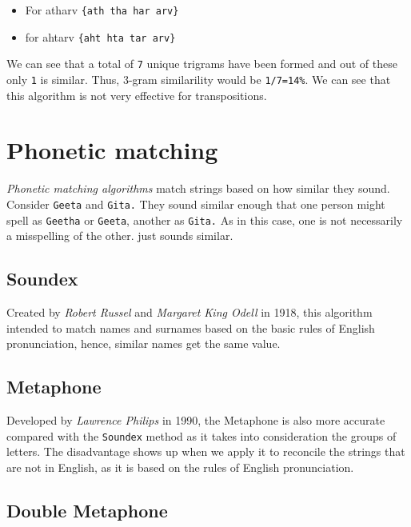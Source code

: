 \documentclass[
]{book}
\providecommand{\tightlist}{%
  \setlength{\itemsep}{0pt}\setlength{\parskip}{0pt}}
\begin{document}
\begin{itemize}
\tightlist
\item
  For atharv \texttt{\{ath\ tha\ har\ arv\}}
\item
  for ahtarv \texttt{\{aht\ hta\ tar\ arv\}}
\end{itemize}

We can see that a total of \texttt{7} unique trigrams have been formed and out of these only \texttt{1} is similar. Thus, 3-gram similarility would be \texttt{1/7=14\%}. We can see that this algorithm is not very effective for transpositions.

\hypertarget{phonetic-matching}{%
\section{Phonetic matching}\label{phonetic-matching}}

\emph{Phonetic matching algorithms} match strings based on how similar they sound. Consider \texttt{Geeta} and \texttt{Gita.} They sound similar enough that one person might spell as \texttt{Geetha} or \texttt{Geeta}, another as \texttt{Gita.} As in this case, one is not necessarily a misspelling of the other. just sounds similar.

\hypertarget{soundex}{%
\subsection{Soundex}\label{soundex}}

Created by \emph{Robert Russel} and \emph{Margaret King Odell} in 1918, this algorithm intended to match names and surnames based on the basic rules of English pronunciation, hence, similar names get the same value.

\hypertarget{metaphone}{%
\subsection{Metaphone}\label{metaphone}}

Developed by \emph{Lawrence Philips} in 1990, the Metaphone is also more accurate compared with the \texttt{Soundex} method as it takes into consideration the groups of letters. The disadvantage shows up when we apply it to reconcile the strings that are not in English, as it is based on the rules of English pronunciation.

\hypertarget{double-metaphone}{%
\subsection{Double Metaphone}\label{double-metaphone}}
\end{document}
